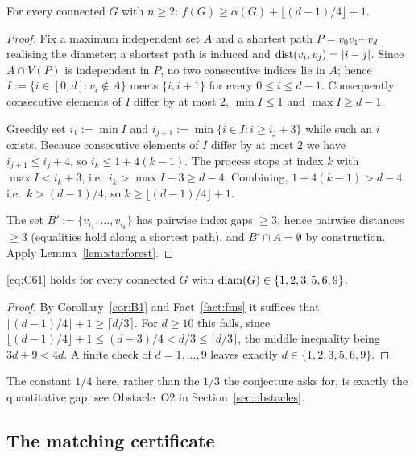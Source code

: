 \begin{corollary}\label{cor:B1}
\Selem
For every connected $G$ with $n \ge 2$:
$f(G) \ge \alpha(G) + \lfloor (d-1)/4 \rfloor + 1$.
\end{corollary}

\begin{proof}
Fix a maximum independent set $A$ and a shortest path $P = v_0v_1\cdots v_d$ realising the
diameter; a shortest path is induced and $\operatorname{dist}(v_i,v_j) = |i-j|$. Since $A \cap V(P)$ is
independent in $P$, no two consecutive indices lie in $A$; hence
$I := \{ i \in [0,d] : v_i \notin A \}$ meets $\{i,i+1\}$ for every $0 \le i \le d-1$.
Consequently consecutive elements of $I$ differ by at most $2$, $\min I \le 1$ and
$\max I \ge d-1$.

Greedily set $i_1 := \min I$ and $i_{j+1} := \min\{ i \in I : i \ge i_j + 3 \}$ while such
an $i$ exists. Because consecutive elements of $I$ differ by at most $2$ we have
$i_{j+1} \le i_j + 4$, so $i_k \le 1 + 4(k-1)$. The process stops at index $k$ with
$\max I < i_k + 3$, i.e.\ $i_k > \max I - 3 \ge d-4$. Combining,
$1 + 4(k-1) > d-4$, i.e.\ $k > (d-1)/4$, so $k \ge \lfloor (d-1)/4 \rfloor + 1$.

The set $B' := \{v_{i_1},\dots,v_{i_k}\}$ has pairwise index gaps $\ge 3$, hence pairwise
distances $\ge 3$ (equalities hold along a shortest path), and $B' \cap A = \emptyset$ by
construction. Apply Lemma~\ref{lem:starforest}.
\end{proof}

\begin{corollary}\label{cor:B2}
\Selem
\eqref{eq:C61} holds for every connected $G$ with
$\operatorname{diam}(G) \in \{1,2,3,5,6,9\}$.
\end{corollary}

\begin{proof}
By Corollary~\ref{cor:B1} and Fact~\ref{fact:fms} it suffices that
$\lfloor (d-1)/4 \rfloor + 1 \ge \lceil d/3 \rceil$. For $d \ge 10$ this fails, since
$\lfloor (d-1)/4 \rfloor + 1 \le (d+3)/4 < d/3 \le \lceil d/3 \rceil$, the middle
inequality being $3d + 9 < 4d$. A finite check of $d = 1,\dots,9$ leaves exactly
$d \in \{1,2,3,5,6,9\}$.
\end{proof}

The constant $1/4$ here, rather than the $1/3$ the conjecture asks for, is exactly the
quantitative gap; see Obstacle~O2 in Section~\ref{sec:obstacles}.

\subsection{The matching certificate}

